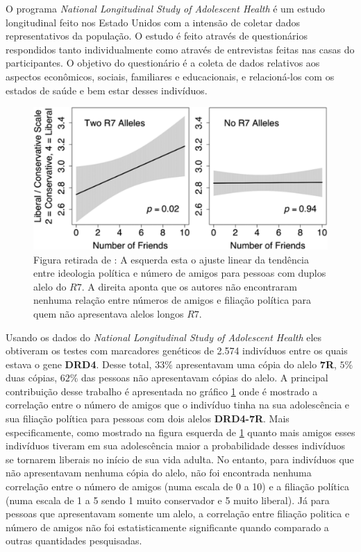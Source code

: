 O programa \textit{National Longitudinal Study of Adolescent Health} é um
estudo longitudinal feito nos Estado Unidos com a intensão de coletar dados
representativos da população. O estudo é feito através de questionários
respondidos tanto individualmente como através de entrevistas feitas nas
casas do participantes. O objetivo do questionário é a coleta de dados
relativos aos aspectos econômicos, sociais, familiares e educacionais,
e relacioná-los com os estados de saúde e bem estar desses indivíduos.

\begin{figure}
    \centering
    \includegraphics[scale=0.4]{Figures/DRD4_Fowler}
    \caption{
        Figura retirada de \citep{Dawes2009}: A esquerda esta o ajuste
        linear da tendência entre ideologia política e número de amigos
        para pessoas com duplos alelo do $R7$. A direita aponta que os
        autores não encontraram nenhuma relação entre números de amigos
        e filiação política para quem não apresentava alelos longos $R7$.
    }
    \label{fig:DRD4}
\end{figure}

Usando os dados do \textit{National Longitudinal Study of Adolescent Health}
eles obtiveram os testes com marcadores genéticos de 2.574 indivíduos entre os
quais estava o gene \textbf{DRD4}. Desse total, $33\%$ apresentavam uma cópia
do alelo \textbf{7R}, $5\%$ duas cópias, $62\%$ das pessoas não apresentavam
cópias do alelo.  A principal contribuição desse trabalho é apresentada
no gráfico \ref{fig:DRD4} onde é mostrado a correlação entre o número de
amigos que o indivíduo tinha na sua adolescência e sua filiação política
para pessoas com dois alelos \textbf{DRD4-7R}. Mais especificamente,
como mostrado na figura esquerda de \ref{fig:DRD4} quanto mais amigos
esses indivíduos tiveram em sua adolescência maior a probabilidade desses
indivíduos se tornarem liberais no início de sua vida adulta. No entanto,
para indivíduos que não apresentavam nenhuma cópia do alelo, não foi
encontrada nenhuma correlação entre o número de amigos (numa escala
de 0 a 10) e a filiação política (numa escala de 1 a 5 sendo 1 muito
conservador e 5 muito liberal). Já para pessoas que apresentavam somente
um alelo, a correlação entre filiação politica e número de amigos não
foi estatisticamente significante quando comparado a outras quantidades
pesquisadas.

